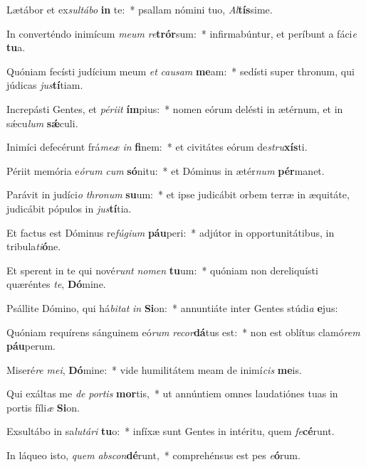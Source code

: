 \item Lætábor et ex\textit{sul}\textit{tá}\textit{bo} \textbf{in} te:~* psallam nómini tuo, \textit{Al}\textbf{tís}sime.
\item In converténdo inimícum \textit{me}\textit{um} \textit{re}\textbf{trór}sum:~* infirmabúntur, et períbunt a fáci\textit{e} \textbf{tu}a.
\item Quóniam fecísti judícium meum \textit{et} \textit{cau}\textit{sam} \textbf{me}am:~* sedísti super thronum, qui júdicas \textit{jus}\textbf{tí}tiam.
\item Increpásti Gentes, et \textit{pér}\textit{i}\textit{it} \textbf{ím}pius:~* nomen eórum delésti in ætérnum, et in sǽcu\textit{lum} \textbf{sǽ}culi.
\item Inimíci defecérunt frá\textit{me}\textit{æ} \textit{in} \textbf{fi}nem:~* et civitátes eórum de\textit{stru}\textbf{xís}ti.
\item Périit memória e\textit{ó}\textit{rum} \textit{cum} \textbf{só}nitu:~* et Dóminus in ætér\textit{num} \textbf{pér}manet.
\item Parávit in judíci\textit{o} \textit{thro}\textit{num} \textbf{su}um:~* et ipse judicábit orbem terræ in æquitáte, judicábit pópulos in \textit{jus}\textbf{tí}tia.
\item Et factus est Dóminus re\textit{fú}\textit{gi}\textit{um} \textbf{páu}peri:~* adjútor in opportunitátibus, in tribula\textit{ti}\textbf{ó}ne.
\item Et sperent in te qui nové\textit{runt} \textit{no}\textit{men} \textbf{tu}um:~* quóniam non dereliquísti quæréntes \textit{te}, \textbf{Dó}mine.
\item Psállite Dómino, qui há\textit{bi}\textit{tat} \textit{in} \textbf{Si}on:~* annuntiáte inter Gentes stúdi\textit{a} \textbf{e}jus:
\item Quóniam requírens sánguinem eó\textit{rum} \textit{re}\textit{cor}\textbf{dá}tus est:~* non est oblítus clamó\textit{rem} \textbf{páu}perum.
\item Miseré\textit{re} \textit{me}\textit{i}, \textbf{Dó}mine:~* vide humilitátem meam de inimí\textit{cis} \textbf{me}is.
\item Qui exáltas me \textit{de} \textit{por}\textit{tis} \textbf{mor}tis,~* ut annúntiem omnes laudatiónes tuas in portis fíli\textit{æ} \textbf{Si}on.
\item Exsultábo in sa\textit{lu}\textit{tá}\textit{ri} \textbf{tu}o:~* infíxæ sunt Gentes in intéritu, quem \textit{fe}\textbf{cé}runt.
\item In láqueo isto, \textit{quem} \textit{abs}\textit{con}\textbf{dé}runt,~* comprehénsus est pes \textit{e}\textbf{ó}rum.
